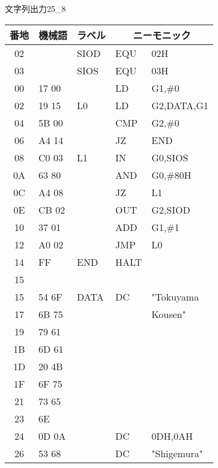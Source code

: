\begin{reidai}{文字列出力2}{5_8}
\begin{description}
{\tt\footnotesize\begin{center}
\begin{tabular}{|c|l|l|l l|} \hline
番地 & 機械語 & ラベル & \multicolumn{2}{|c|}{ニーモニック} \\
\hline
02 &         &  SIOD  &  EQU    & 02H            \\
03 &         &  SIOS  &  EQU    & 03H            \\
00 &  17 00  &        &  LD     & G1,\#0         \\
02 &  19 15  &  L0    &  LD     & G2,DATA,G1     \\
04 &  5B 00  &        &  CMP    & G2,\#0         \\
06 &  A4 14  &        &  JZ     & END            \\
08 &  C0 03  &  L1    &  IN     & G0,SIOS        \\
0A &  63 80  &        &  AND    & G0,\#80H       \\
0C &  A4 08  &        &  JZ     & L1             \\
0E &  CB 02  &        &  OUT    & G2,SIOD        \\
10 &  37 01  &        &  ADD    & G1,\#1         \\
12 &  A0 02  &        &  JMP    & L0             \\
14 &  FF     &  END   &  HALT   &                \\
15 &         &        &         &                \\
15 &  54 6F  &  DATA  &  DC     & "Tokuyama      \\
17 &  6B 75  &        &         &   Kousen"      \\
19 &  79 61  &        &         &                \\
1B &  6D 61  &        &         &                \\
1D &  20 4B  &        &         &                \\
1F &  6F 75  &        &         &                \\
21 &  73 65  &        &         &                \\
23 &  6E     &        &         &                \\
24 &  0D 0A  &        &  DC     & 0DH,0AH        \\
26 &  53 68  &        &  DC     & "Shigemura"    \\

\end{tabular}
\end{center}}
\end{description}
\end{reidai}
